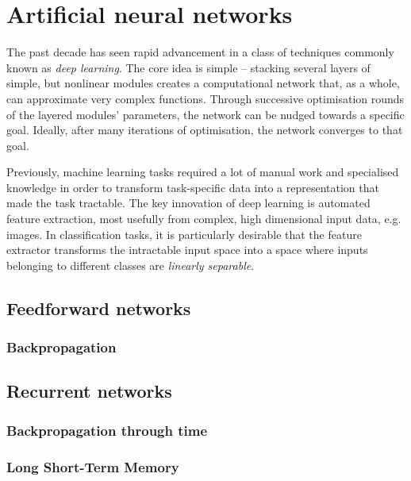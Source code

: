 \documentclass[../../report.tex]{subfiles}
\begin{document}
\section{Artificial neural networks}

The past decade has seen rapid advancement in a class of techniques commonly
known as \emph{deep learning}. The core idea is simple -- stacking several
layers of simple, but nonlinear modules creates a computational network that, as
a whole, can approximate very complex functions. Through successive optimisation
rounds of the layered modules' parameters, the network can be nudged towards a
specific goal. Ideally, after many iterations of optimisation, the network
converges to that goal.

Previously, machine learning tasks required a lot of manual work and specialised
knowledge in order to transform task-specific data into a representation that
made the task tractable. The key innovation of deep learning is automated
feature extraction, most usefully from complex, high dimensional input data,
e.g. images. In classification tasks, it is particularly desirable that the
feature extractor transforms the intractable input space into a space where
inputs belonging to different classes are \emph{linearly separable}.
\cite{LeCun2015}


\subsection{Feedforward networks}


\subsubsection{Backpropagation}


\subsection{Recurrent networks}


\subsubsection{Backpropagation through time}


\subsubsection{Long Short-Term Memory}

\end{document}
